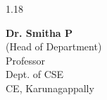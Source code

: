\begin{spacing}{1.18}
\begin{center}
\vspace{1.0cm}

{\bfseries Dr. Smitha P} \\
(Head of Department) \\
Professor \\
Dept. of CSE \\
CE, Karunagappally
\end{center}

\end{spacing}

\thispagestyle{empty}
\endgroup
